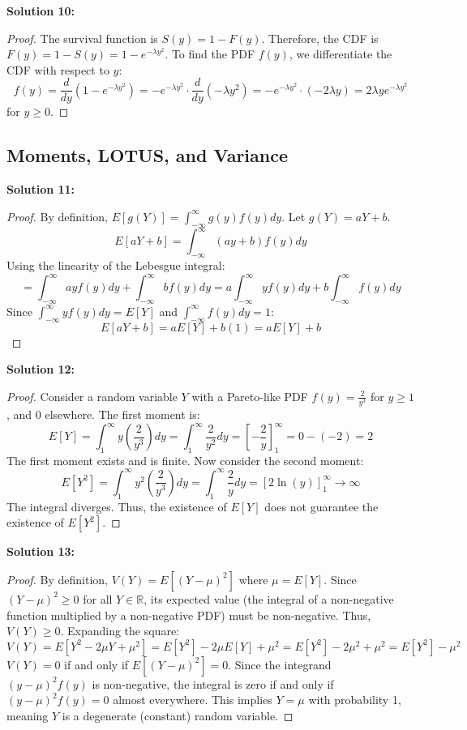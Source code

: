 \documentclass[11pt, a4paper]{article}
\theoremstyle{definition}
\theoremstyle{remark}
\newcommand{\R}{\mathbb{R}}
\begin{document}
\textbf{Solution 10:}
\begin{proof}
The survival function is $S(y) = 1 - F(y)$. Therefore, the CDF is $F(y) = 1 - S(y) = 1 - e^{-\lambda y^2}$.
To find the PDF $f(y)$, we differentiate the CDF with respect to $y$:
\[ f(y) = \frac{d}{dy} \left( 1 - e^{-\lambda y^2} \right) = -e^{-\lambda y^2} \cdot \frac{d}{dy}(-\lambda y^2) = -e^{-\lambda y^2} \cdot (-2\lambda y) = 2\lambda y e^{-\lambda y^2} \]
for $y \ge 0$.
\end{proof}

\subsection{Moments, LOTUS, and Variance}

\textbf{Solution 11:}
\begin{proof}
By definition, $E[g(Y)] = \int_{-\infty}^\infty g(y)f(y) dy$. Let $g(Y) = aY + b$.
\[ E[aY+b] = \int_{-\infty}^\infty (ay+b)f(y) dy \]
Using the linearity of the Lebesgue integral:
\[ = \int_{-\infty}^\infty ay f(y) dy + \int_{-\infty}^\infty b f(y) dy = a \int_{-\infty}^\infty y f(y) dy + b \int_{-\infty}^\infty f(y) dy \]
Since $\int_{-\infty}^\infty y f(y) dy = E[Y]$ and $\int_{-\infty}^\infty f(y) dy = 1$:
\[ E[aY+b] = aE[Y] + b(1) = aE[Y] + b \]
\end{proof}

\textbf{Solution 12:}
\begin{proof}
Consider a random variable $Y$ with a Pareto-like PDF $f(y) = \frac{2}{y^3}$ for $y \ge 1$, and $0$ elsewhere.
The first moment is:
\[ E[Y] = \int_1^\infty y \left(\frac{2}{y^3}\right) dy = \int_1^\infty \frac{2}{y^2} dy = \left[ -\frac{2}{y} \right]_1^\infty = 0 - (-2) = 2 \]
The first moment exists and is finite. Now consider the second moment:
\[ E[Y^2] = \int_1^\infty y^2 \left(\frac{2}{y^3}\right) dy = \int_1^\infty \frac{2}{y} dy = \left[ 2 \ln(y) \right]_1^\infty \to \infty \]
The integral diverges. Thus, the existence of $E[Y]$ does not guarantee the existence of $E[Y^2]$.
\end{proof}

\textbf{Solution 13:}
\begin{proof}
By definition, $V(Y) = E[(Y - \mu)^2]$ where $\mu = E[Y]$. 
Since $(Y - \mu)^2 \ge 0$ for all $Y \in \R$, its expected value (the integral of a non-negative function multiplied by a non-negative PDF) must be non-negative. Thus, $V(Y) \ge 0$.
Expanding the square:
\[ V(Y) = E[Y^2 - 2\mu Y + \mu^2] = E[Y^2] - 2\mu E[Y] + \mu^2 = E[Y^2] - 2\mu^2 + \mu^2 = E[Y^2] - \mu^2 \]
$V(Y) = 0$ if and only if $E[(Y - \mu)^2] = 0$. Since the integrand $(y-\mu)^2 f(y)$ is non-negative, the integral is zero if and only if $(y-\mu)^2 f(y) = 0$ almost everywhere. This implies $Y = \mu$ with probability 1, meaning $Y$ is a degenerate (constant) random variable.
\end{proof}
\end{document}
